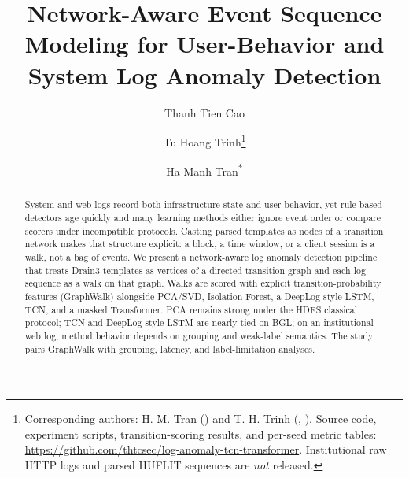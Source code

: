 \documentclass[runningheads]{llncs}
\begin{document}
%
\title{Network-Aware Event Sequence Modeling for User-Behavior and System Log Anomaly Detection}

\author{Thanh Tien Cao \and
Tu Hoang Trinh\thanks{Corresponding authors: H. M. Tran () and T. H. Trinh (, ). Source code, experiment scripts, transition-scoring results, and per-seed metric tables: \protect\url{https://github.com/thtcsec/log-anomaly-tcn-transformer}. Institutional raw HTTP logs and parsed HUFLIT sequences are \emph{not} released.} \and
Ha Manh Tran\textsuperscript{*}}
%


\maketitle
%
\begin{abstract}
System and web logs record both infrastructure state and user behavior, yet rule-based detectors age quickly and many learning methods either ignore event order or compare scorers under incompatible protocols. Casting parsed templates as nodes of a transition network makes that structure explicit: a block, a time window, or a client session is a walk, not a bag of events.
We present a network-aware log anomaly detection pipeline that treats Drain3 templates as vertices of a directed transition graph and each log sequence as a walk on that graph. Walks are scored with explicit transition-probability features (GraphWalk) alongside PCA/SVD, Isolation Forest, a DeepLog-style LSTM, TCN, and a masked Transformer. PCA remains strong under the HDFS classical protocol; TCN and DeepLog-style LSTM are nearly tied on BGL; on an institutional web log, method behavior depends on grouping and weak-label semantics. The study pairs GraphWalk with grouping, latency, and label-limitation analyses.

\end{abstract}
\end{document}
